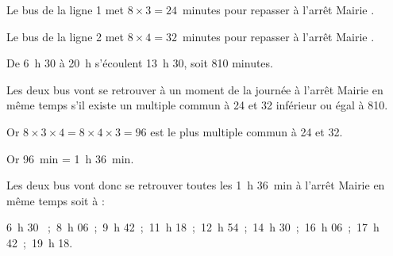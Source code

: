 
\medskip

%
%
%
Le bus de la ligne 1 met $8 \times 3 = 24$~minutes pour repasser à l'arrêt \og Mairie \fg.

Le bus de la ligne 2 met $8 \times 4 = 32$~minutes pour repasser à l'arrêt \og Mairie \fg.

De 6~h 30 à 20~h s'écoulent 13~h 30, soit 810 minutes.

Les deux bus vont se retrouver à un moment de la journée à l'arrêt
\og Mairie \fg{} en même temps s'il existe un multiple commun à 24 et 32 inférieur ou égal à 810.

Or $ 8 \times 3 \times 4 = 8 \times 4 \times 3 = 96$ est le plus multiple commun à 24 et 32.

Or 96~min = 1~h 36~min.

Les deux bus vont donc se retrouver toutes les 1~h 36~min à l'arrêt
\og Mairie \fg{} en même temps soit à :

6~h 30 ~;~8~h 06~;~9~h 42~;~11~h 18~;~12~h 54~;~14~h 30~;~16~h 06~;~17~h 42~;~19~h 18.
